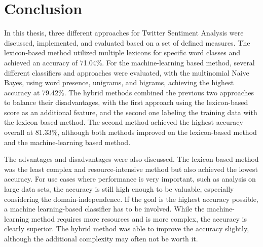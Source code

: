 \chapter{Conclusion}
\label{cha:Chapter5_Conclusion}

\iffalse

Length: 1-2 pages

Effort: 1-2 days


Zusammenfassung der Ergebnisse, Ausblick --> was kann man noch machen, auf Ergebnisse aufbauen, weiterfuehrende Themen

Beim Erstellen der Arbeit --> nicht jeder Idee hinterherrennen, eher dann fuer Conclusion

Implementation source code --> muss nicht sein, kann auch ein link auf github sein

\fi

In this thesis, three different approaches for Twitter Sentiment Analysis were discussed, implemented, and evaluated based on a set of defined measures. The lexicon-based method utilized multiple lexicons for specific word classes and achieved an accuracy of 71.04\%. For the machine-learning based method, several different classifiers and approaches were evaluated, with the multinomial Naive Bayes, using word presence, unigrams, and bigrams, achieving the highest accuracy at 79.42\%. The hybrid methods combined the previous two approaches to balance their disadvantages, with the first approach using the lexicon-based score as an additional feature, and the second one labeling the training data with the lexicon-based method. The second method achieved the highest accuracy overall at 81.33\%, although both methods improved on the lexicon-based method and the machine-learning based method.

The advantages and disadvantages were also discussed. The lexicon-based method was the least complex and resource-intensive method but also achieved the lowest accuracy. For use cases where performance is very important, such as analysis on large data sets, the accuracy is still high enough to be valuable, especially considering the domain-independence. If the goal is the highest accuracy possible, a machine learning-based classifier has to be involved. While the machine-learning method requires more resources and is more complex, the accuracy is clearly superior. The hybrid method was able to improve the accuracy slightly, although the additional complexity may often not be worth it.

